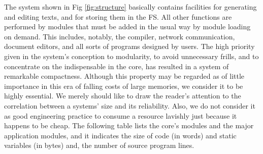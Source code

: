 The system shown in Fig \ref{fig:structure} basically contains facilities for generating
and editing texts, and for storing them in the FS. All other functions are performed by
modules that must be added in the usual way by module loading on demand. This includes,
notably, the compiler, network communication, document editors, and all sorts of programs
designed by users. The high priority given in the system's conception to modularity, to
avoid unnecessary frills, and to concentrate on the indispensable in the core, has resulted
in a system of remarkable compactness. Although this property may be regarded as of little
importance in this era of falling costs of large memories, we consider it to be highly
essential. We merely should like to draw the reader's attention to the correlation between
a systems' size and its reliability. Also, we do not consider it as good engineering practice
to consume a resource lavishly just because it happens to be cheap. The following table lists
the core's modules and the major application modules, and it indicates the size of code
(in words) and static variables (in bytes) and, the number of source program lines.
